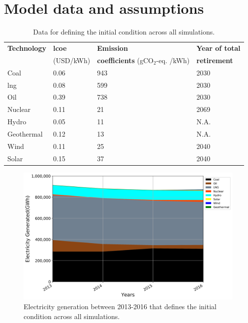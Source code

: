 \section{Model data and assumptions} \label{Appendix}

\begin{table}[H]
	\caption{Data for defining the initial condition across all simulations.}
	\vspace{0.1in}
	\begin{tabularx}{1.2\textwidth}{p{} p{} p{} p{}}
		\hline
\textbf{Technology} & \textbf{\gls{lcoe}} \cite{lazard_lazards_2016} & \textbf{Emission} & \textbf{Year of total}\\
  & (USD/kWh) & \textbf{coefficients} \cite{noauthor_electricity_2019} (gCO$_2$-eq. /kWh) & \textbf{retirement} \\
\hline
Coal & 0.06 & 943 & 2030 \\
\gls{lng} & 0.08 & 599 & 2030 \\
Oil & 0.39 & 738 & 2030 \\
Nuclear & 0.11 & 21 & 2069 \\
Hydro & 0.05 & 11 & N.A. \\
Geothermal & 0.12 & 13 & N.A. \\
Wind & 0.11 & 25 & 2040 \\
Solar & 0.15 & 37 & 2040 \\
\hline 
\end{tabularx}
\label{init-eco}
\end{table}

\begin{figure}[h] 
\centering
\label{ic-elc}
\includegraphics[scale=0.5]{figures/IC}
\caption{Electricity generation between 2013-2016 that defines the initial condition across all simulations.}
\end{figure}

